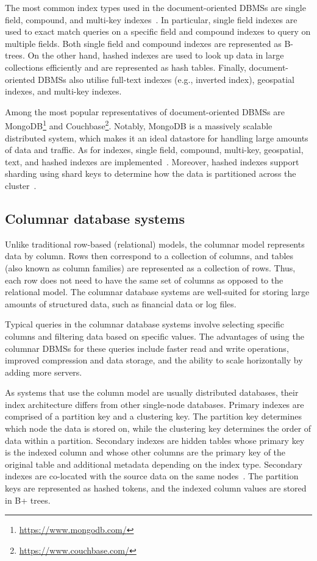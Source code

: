The most common index types used in the document-oriented DBMSs are single field, compound, and multi-key indexes~\citep{mongodbIndexes,couchbaseIndexes}. In particular, single field indexes are used to exact match queries on a specific field and compound indexes to query on multiple fields. Both single field and compound indexes are represented as B-trees. On the other hand, hashed indexes are used to look up data in large collections efficiently and are represented as hash tables. Finally, document-oriented DBMSs also utilise full-text indexes (e.g., inverted index), geospatial indexes, and multi-key indexes.

Among the most popular representatives of document-oriented DBMSs are MongoDB\footnote{\url{https://www.mongodb.com/}} and Couchbase\footnote{\url{https://www.couchbase.com/}}. Notably, MongoDB is a massively scalable distributed system, which makes it an ideal datastore for handling large amounts of data and traffic. As for indexes, single field, compound, multi-key, geospatial, text, and hashed indexes are implemented~\citep{mongodbIndexes}. Moreover, hashed indexes support sharding using shard keys to determine how the data is partitioned across the cluster~\citep{MongoDBSharding}.

\subsection{Columnar database systems}
Unlike traditional row-based (relational) models, the columnar model represents data by column. Rows then correspond to a collection of columns, and tables (also known as column families) are represented as a collection of rows. Thus, each row does not need to have the same set of columns as opposed to the relational model. The columnar database systems are well-suited for storing large amounts of structured data, such as financial data or log files.

Typical queries in the columnar database systems involve selecting specific columns and filtering data based on specific values. The advantages of using the columnar DBMSs for these queries include faster read and write operations, improved compression and data storage, and the ability to scale horizontally by adding more servers.
 
As systems that use the column model are usually distributed databases, their index architecture differs from other single-node databases. Primary indexes are comprised of a partition key and a clustering key. The partition key determines which node the data is stored on, while the clustering key determines the order of data within a partition. Secondary indexes are hidden tables whose primary key is the indexed column and whose other columns are the primary key of the original table and additional metadata depending on the index type. Secondary indexes are co-located with the source data on the same nodes~\citep{cassandraIndexes}. The partition keys are represented as hashed tokens, and the indexed column values are stored in B+ trees.

